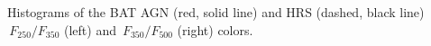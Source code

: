 \label{fig:hist_250_350_color} Histograms of the BAT AGN (red, solid line) and HRS (dashed, black line) $\,F_{250}/F_{350}$ (left) and  $\,F_{350}/F_{500}$ (right) colors.  